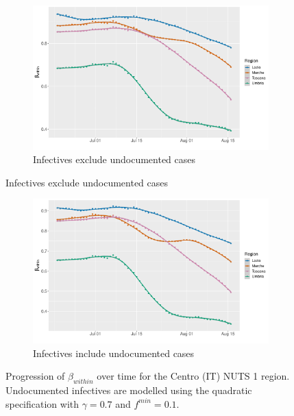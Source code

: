 \documentclass[12pt]{article}
\begin{document}
\begin{appendices}
		\begin{figure}[H]
    	    \centering
    	    \begin{subfigure}{\textwidth}
    	      \centering
    	      \includegraphics[width=0.94\linewidth]{output/model_within_lag14_betawithin_Centro (IT)_rolling.pdf}
    	      \caption{Infectives exclude undocumented cases}
    	      \label{fig:beta_within_over_time_centro_regular}
    	    \end{subfigure}
        \end{figure}
        \begin{figure}[H]\ContinuedFloat
    	    \begin{subfigure}{\textwidth}
    	      \centering
    	      \includegraphics[width=0.94\linewidth]{output/model_within_lag14_betawithin_Centro (IT)_UndocQuadratic_rolling.pdf}
    	      \caption{Infectives include undocumented cases}
    	      \label{fig:beta_within_over_time_centro_regular_undoc}
    	    \end{subfigure}
    	    \caption{Progression of $\beta_{within}$ over time for the Centro (IT) NUTS 1 region. Undocumented infectives are modelled using the quadratic specification with $\gamma = 0.7$ and $f^{min}=0.1$.}
    	    \label{fig:beta_within_over_time_centro}
	    \end{figure}
		

\end{appendices}
\end{document}
